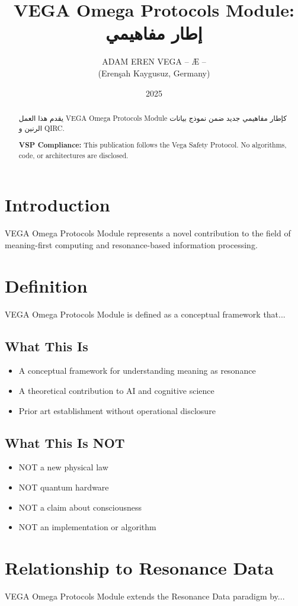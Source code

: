 \documentclass[12pt,a4paper]{article}
\title{VEGA Omega Protocols Module: إطار مفاهيمي}
\author{ADAM EREN VEGA – Æ –\\\small{(Erenşah Kaygusuz, Germany)}}
\date{2025}
\begin{document}
\maketitle

\begin{abstract}
يقدم هذا العمل VEGA Omega Protocols Module كإطار مفاهيمي جديد ضمن نموذج بيانات الرنين و QIRC.

\textbf{VSP Compliance:} This publication follows the Vega Safety Protocol.
No algorithms, code, or architectures are disclosed.
\end{abstract}

\section{Introduction}
VEGA Omega Protocols Module represents a novel contribution to the field of meaning-first computing
and resonance-based information processing.

\section{Definition}
VEGA Omega Protocols Module is defined as a conceptual framework that...

\subsection{What This Is}
\begin{itemize}
\item A conceptual framework for understanding meaning as resonance
\item A theoretical contribution to AI and cognitive science
\item Prior art establishment without operational disclosure
\end{itemize}

\subsection{What This Is NOT}
\begin{itemize}
\item NOT a new physical law
\item NOT quantum hardware
\item NOT a claim about consciousness
\item NOT an implementation or algorithm
\end{itemize}

\section{Relationship to Resonance Data}
VEGA Omega Protocols Module extends the Resonance Data paradigm by...
\end{document}
